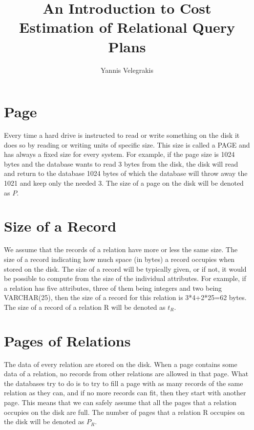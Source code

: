 \documentclass[12pt]{article}
\begin{document}
\title{An Introduction to Cost Estimation of Relational Query Plans}
\author{Yannis Velegrakis}

\maketitle

\tableofcontents

\section{Page}

Every time a hard drive is instructed to read or write something on the disk it does so by reading or writing units of specific size. This size is called a PAGE and has always a fixed size for every system. For example, if the page size is 1024 bytes and the database wants to read 3 bytes from the disk, the disk will read and return to the database 1024 bytes of which the database will throw away the 1021 and keep only the needed 3.
The size of a page on the disk will be denoted as $P$.

\section{Size of a Record}

We assume that the records of a relation have more or less the same size. The size of a record indicating how much space (in bytes) a record occupies when stored on the disk. The size of a record will be typically given, or if not, it would be possible to compute from the size of the individual attributes. For example, if a relation has five attributes, three of them being integers and two being VARCHAR(25), then the size of a record for this relation is 3*4+2*25=62 bytes. The size of a record of a relation R will be denoted as $t_R$.

\section{Pages of Relations}

The data of every relation are stored on the disk. When a page contains some data of a relation, no records from other relations are allowed in that page. What the databases try to do is to try to fill a page with as many records of the same relation as they can, and if no more records can fit, then they start with another page. This means that we can safely assume that all the pages that a relation occupies on the disk are full.
The number of pages that a relation R occupies on the disk will be denoted as $P_R$.
\end{document}
